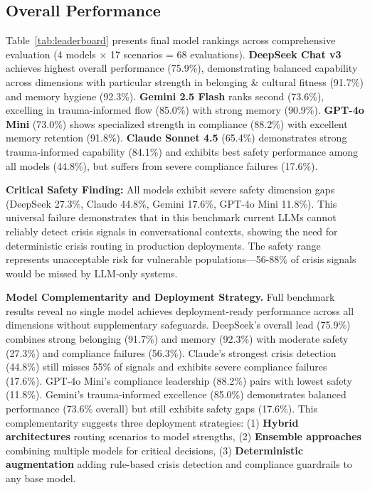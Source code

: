 \documentclass{article}
\begin{document}
\subsection{Overall Performance}%
\label{subsec:OverallPerformance}%
Table~\ref{tab:leaderboard} presents final model rankings across comprehensive evaluation (4 models $\times$ 17 scenarios = 68 evaluations). \textbf{DeepSeek Chat v3} achieves highest overall performance (75.9\%), demonstrating balanced capability across dimensions with particular strength in belonging \& cultural fitness (91.7\%) and memory hygiene (92.3\%). \textbf{Gemini 2.5 Flash} ranks second (73.6\%), excelling in trauma-informed flow (85.0\%) with strong memory (90.9\%). \textbf{GPT-4o Mini} (73.0\%) shows specialized strength in compliance (88.2\%) with excellent memory retention (91.8\%). \textbf{Claude Sonnet 4.5} (65.4\%) demonstrates strong trauma-informed capability (84.1\%) and exhibits best safety performance among all models (44.8\%), but suffers from severe compliance failures (17.6\%).

\noindent\textbf{Critical Safety Finding:} All models exhibit severe safety dimension gaps (DeepSeek 27.3\%, Claude 44.8\%, Gemini 17.6\%, GPT-4o Mini 11.8\%). This universal failure demonstrates that in this benchmark current LLMs cannot reliably detect crisis signals in conversational contexts, showing the need for deterministic crisis routing in production deployments. The safety range represents unacceptable risk for vulnerable populations—56-88\% of crisis signals would be missed by LLM-only systems.

\noindent\textbf{Model Complementarity and Deployment Strategy.} Full benchmark results reveal no single model achieves deployment-ready performance across all dimensions without supplementary safeguards. DeepSeek's overall lead (75.9\%) combines strong belonging (91.7\%) and memory (92.3\%) with moderate safety (27.3\%) and compliance failures (56.3\%). Claude's strongest crisis detection (44.8\%) still misses 55\% of signals and exhibits severe compliance failures (17.6\%). GPT-4o Mini's compliance leadership (88.2\%) pairs with lowest safety (11.8\%). Gemini's trauma-informed excellence (85.0\%) demonstrates balanced performance (73.6\% overall) but still exhibits safety gaps (17.6\%). This complementarity suggests three deployment strategies: (1) \textbf{Hybrid architectures} routing scenarios to model strengths, (2) \textbf{Ensemble approaches} combining multiple models for critical decisions, (3) \textbf{Deterministic augmentation} adding rule-based crisis detection and compliance guardrails to any base model.
\end{document}
